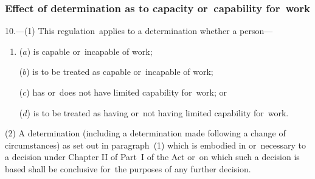 \documentclass[12pt,a4paper]{article}
\begin{document}

%

\subsubsection[10. Effect of determination as to capacity or~capability for~work]{Effect of determination as to capacity or~capability for~work}

10.---(1)  This regulation~applies to a determination whether a person—
\begin{enumerate}\item[]
($a$) is capable or~incapable of work;

($b$) is to be treated as capable or~incapable of work;

($c$) has or~does not have limited capability for~work; or

($d$) is to be treated as having or~not having limited capability for~work.
\end{enumerate}

(2) A determination (including a determination made following a change of circumstances) as set out in paragraph~(1) which is embodied in or~necessary to a decision under Chapter II of Part~I of the Act or~on which such a decision is based shall be conclusive for~the purposes of any further decision.

\end{document}
